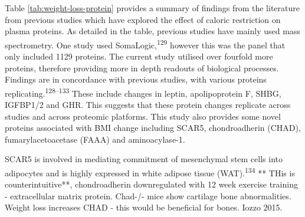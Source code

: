 \documentclass[11pt,twoside]{bristolthesis}
\begin{document}
Table \ref{tab:weight-loss-protein} provides a summary of findings from the literature from previous studies which have explored the effect of caloric restriction on plasma proteins. As detailed in the table, previous studies have mainly used mass spectrometry. One study used SomaLogic,\textsuperscript{129} however this was the panel that only included 1129 proteins. The current study utilised over fourfold more proteins, therefore providing more in depth readouts of biological processes. Findings are in concordance with previous studies, with various proteins replicating.\textsuperscript{128--133} These include changes in leptin, apolipoprotein F, SHBG, IGFBP1/2 and GHR. This suggests that these protein changes replicate across studies and across proteomic platforms. This study also provides some novel proteins associated with BMI change including SCAR5, chondroadherin (CHAD), fumarylacetoacetase (FAAA) and aminoacylase-1.

SCAR5 is involved in mediating commitment of mesenchymal stem cells into adipocytes and is highly expressed in white adipose tissue (WAT).\textsuperscript{134} ** THis is counterintuitive**, chondroadherin downregulated with 12 week exercise training - extracellular matrix protein. Chad-/- mice show cartilage bone abnormalities. Weight loss increases CHAD - this would be beneficial for bones. Iozzo 2015.
\end{document}
